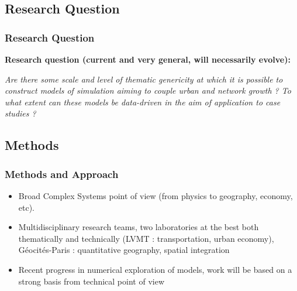 \subsection{Research Question}


\begin{frame}
\frametitle{Research Question}
\begin{justify}
\vfill{}
\textbf{Research question (current and very general, will necessarily evolve):}\bigskip

\textit{Are there some scale and level of thematic genericity at which it is possible to construct models of simulation aiming to couple urban and network growth ? To what extent can these models be data-driven in the aim of application to case studies ?}
\vfill{}

\end{justify}
\end{frame}




\subsection{Methods}

\begin{frame}
\frametitle{Methods and Approach}

\begin{itemize}
\vfill{}
\item \begin{justify}Broad Complex Systems point of view (from physics to geography, economy, etc).\end{justify}
\vfill{}
\item \begin{justify}Multidisciplinary research teams, two laboratories at the best both thematically and technically (LVMT : transportation, urban economy), G{\'e}ocités-Paris : quantitative geography, spatial integration\end{justify}
\vfill{}
\item \begin{justify}Recent progress in numerical exploration of models, work will be based on a strong basis from technical point of view~\cite{reuillon2013openmole,schmitt2014half}\end{justify}
\vfill{}

\end{itemize}

\end{frame}


















